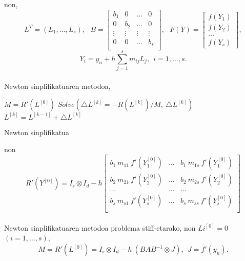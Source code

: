 non,
\begin{equation*}
L^T=(L_1,\dots,L_s), \ \ \
B=
\begin{bmatrix}
   b_{1} & 0      & \dots & 0 \\
   0     & b_{2}  & \dots & 0 \\
    \vdots & \vdots & \vdots  & \vdots \\
   0     & 0      & \dots & b_{s}\\
\end{bmatrix}
, \ \ \ 
F(Y)=
\begin{bmatrix}
     f(Y_1) \\
     f(Y_2) \\
     \dots  \\
     f(Y_s)
\end{bmatrix},     
\end{equation*}
\begin{equation*}
Y_i=y_n+h \sum\limits_{j=1}^{s} m_{ij} L_j, \ \ i=1,\dots,s.
\end{equation*}


\paragraph*{} Newton sinplifikatuaren metodoa,
\begin{algorithm}[h]
  $M=R'(L^{[0]})$\;
  {
   \BlankLine
   $Solve(\triangle L^{[k]}=- R(L^{[k]})/M, \ \triangle L^{[k]})$\;
   \BlankLine
   $L^{[k]}=L^{[k-1]}+\triangle L^{[k]}$\;
  }
 \caption{Newton sinplifikatua}
\end{algorithm}

non 
\begin{equation*}
R'(Y^{[0]})=I_s \otimes I_d - h  
\begin{bmatrix}
b_1 \  m_{11}  \ f'(Y_1^{[0]})   & \dots & b_1 \  m_{1s} \ f'(Y_1^{[0]})  \\
b_2 \  m_{21} \ f'(Y_2^{[0]})   & \dots & b_2 \  m_{2s}  \ f'(Y_2^{[0]})  \\
\dots          & \dots & \dots \\
b_s \  m_{s1} \ f'(Y_s^{[0]})  & \dots & b_s \  m_{ss}  \ f'(Y_s^{[0]})   \\ 
\end{bmatrix}
\end{equation*}

\paragraph*{} Newton sinplifikatuaren metodoa problema stiff-etarako, non $Li^{[0]}=0$ $(i=1,\dots,s)$,
\begin{equation*}
M=R'(L^{[0]})=I_s \otimes I_d - h \ (BAB^{-1} \otimes J), \ \ J=f'(y_n).
\end{equation*}

